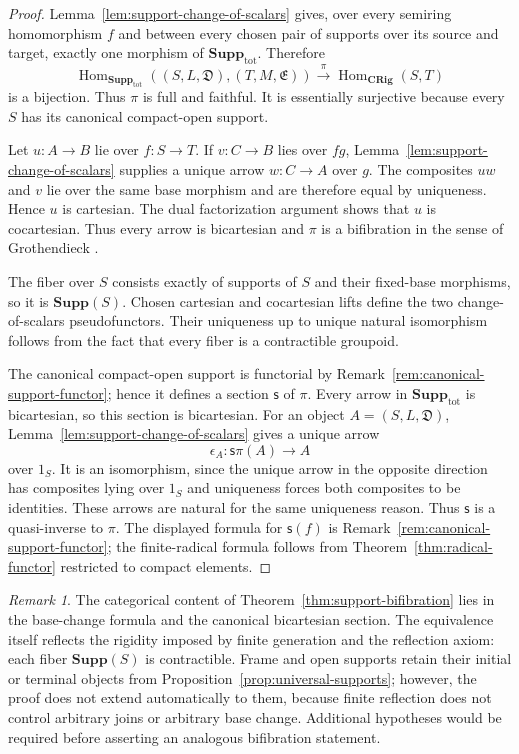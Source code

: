 \documentclass[12pt,leqno]{amsart}
\newcommand{\CRig}{\mathbf{CRig}}
\newcommand{\Supp}{\mathbf{Supp}}
\newcommand{\TotSupp}{\mathbf{Supp}_{\mathrm{tot}}}
\theoremstyle{definition}
\numberwithin{equation}{section}
\theoremstyle{remark}
\newtheorem{remark}[theorem]{Remark}
\begin{document}
\begin{proof}
Lemma~\ref{lem:support-change-of-scalars} gives, over every semiring homomorphism $f$ and between every chosen pair of supports over its source and target, exactly one morphism of \(\TotSupp\). Therefore
\[
\operatorname{Hom}_{\TotSupp}
 ((S,L,\mathfrak D),(T,M,\mathfrak E))
 \xrightarrow{\ \pi\ }
\operatorname{Hom}_{\CRig}(S,T)
\]
is a bijection. Thus $\pi$ is full and faithful. It is essentially surjective because every $S$ has its canonical compact-open support.

Let $u\colon A\to B$ lie over $f\colon S\to T$. If
$v\colon C\to B$ lies over $f g$, Lemma~\ref{lem:support-change-of-scalars} supplies a unique arrow $w\colon C\to A$ over $g$. The composites $u w$ and $v$ lie over the same base morphism and are therefore equal by uniqueness. Hence $u$ is cartesian. The dual factorization argument shows that $u$ is cocartesian. Thus every arrow is bicartesian and $\pi$ is a bifibration in the sense of Grothendieck \cite{GrothendieckFib}.

The fiber over $S$ consists exactly of supports of $S$ and their fixed-base morphisms, so it is \(\Supp(S)\). Chosen cartesian and cocartesian lifts define the two change-of-scalars pseudofunctors. Their uniqueness up to unique natural isomorphism follows from the fact that every fiber is a contractible groupoid.

The canonical compact-open support is functorial by Remark~\ref{rem:canonical-support-functor}; hence it defines a section $\mathsf s$ of $\pi$. Every arrow in $\TotSupp$ is bicartesian, so this section is bicartesian. For an object $A=(S,L,\mathfrak D)$, Lemma~\ref{lem:support-change-of-scalars} gives a unique arrow
\[
\epsilon_A\colon\mathsf s\pi(A)\longrightarrow A
\]
over $1_S$. It is an isomorphism, since the unique arrow in the opposite direction has composites lying over $1_S$ and uniqueness forces both composites to be identities. These arrows are natural for the same uniqueness reason. Thus $\mathsf s$ is a quasi-inverse to $\pi$. The displayed formula for $\mathsf s(f)$ is Remark~\ref{rem:canonical-support-functor}; the finite-radical formula follows from Theorem~\ref{thm:radical-functor} restricted to compact elements.
\end{proof}

\begin{remark}
The categorical content of Theorem~\ref{thm:support-bifibration} lies in the base-change formula and the canonical bicartesian section. The equivalence itself reflects the rigidity imposed by finite generation and the reflection axiom: each fiber \(\Supp(S)\) is contractible. Frame and open supports retain their initial or terminal objects from Proposition~\ref{prop:universal-supports}; however, the proof does not extend automatically to them, because finite reflection does not control arbitrary joins or arbitrary base change. Additional hypotheses would be required before asserting an analogous bifibration statement.
\end{remark}
\end{document}
